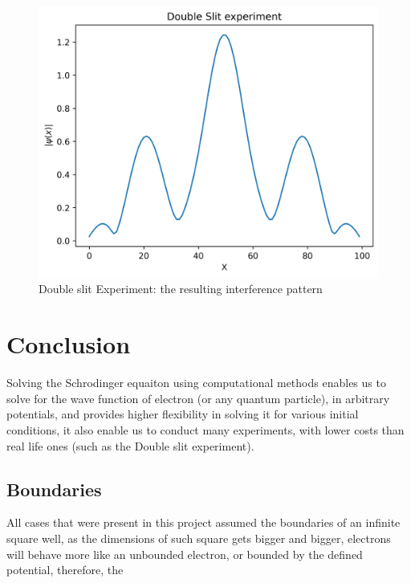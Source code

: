 \documentclass[10pt, a4paper]{article}
\begin{document}
\begin{adjustwidth}{1cm}{}
\begin{figure}[H]
    \centering
    \includegraphics[scale = 0.7]{Double_slit_experiment_absolutevalue.png}
    \caption{Double slit Experiment: the resulting interference pattern}
    \label{fig:Double_Slit_2}
\end{figure}
\end{adjustwidth}


\section{\Large \textbf{Conclusion}}
\begin{adjustwidth}{1cm}{}
    Solving the Schrodinger equaiton using computational methods enables us to solve for the wave function of electron (or any quantum particle), in arbitrary potentials, and provides higher flexibility in solving it for various initial conditions, it also enable us to conduct many experiments, with lower costs than real life ones (such as the Double slit experiment).
    \subsection{Boundaries}
    All cases that were present in this project assumed the boundaries of an infinite square well, as the dimensions of such square gets bigger and bigger, electrons will behave more like an unbounded electron, or bounded by the defined potential, therefore, the 
\end{adjustwidth}
\end{document}
